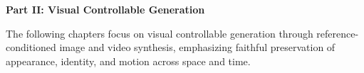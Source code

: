 
\cleardoublepage
{}
{}
\thispagestyle{plain}

\vspace*{\fill}
\begin{center}
{\Huge\bfseries Part II: Visual Controllable Generation\par}
\vspace{1.5cm}
\begin{minipage}{0.8\textwidth}
\centering
The following chapters focus on visual controllable generation through reference-conditioned image and video synthesis, emphasizing faithful preservation of appearance, identity, and motion across space and time.
\end{minipage}
\end{center}
\vspace*{\fill}

\clearpage
